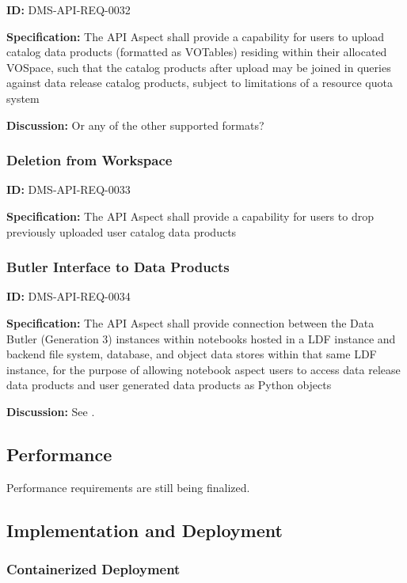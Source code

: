 \documentclass[SE,toc,lsstdraft]{lsstdoc}
\begin{document}
\label{DMS-API-REQ-0032}
\textbf{ID:} DMS-API-REQ-0032

\textbf{Specification:}
The API Aspect shall provide a capability for users to upload catalog data products (formatted as VOTables) residing within their allocated VOSpace, such that the catalog products after upload may be joined in queries against data release catalog products, subject to limitations of a resource quota system

\textbf{Discussion:}
Or any of the other supported formats?

\subsubsection{Deletion from Workspace}

\label{DMS-API-REQ-0033}
\textbf{ID:} DMS-API-REQ-0033

\textbf{Specification:}
The API Aspect shall provide a capability for users to drop previously uploaded user catalog data products

\subsubsection{Butler Interface to Data Products}

\label{DMS-API-REQ-0034}
\textbf{ID:} DMS-API-REQ-0034

\textbf{Specification:}
The API Aspect shall provide connection between the Data Butler (Generation 3) instances within notebooks hosted in a LDF instance and backend file system, database, and object data stores within that same LDF instance, for the purpose of allowing notebook aspect users to access data release data products and user generated data products as Python objects

\textbf{Discussion:}
See .

\subsection{Performance}

Performance requirements are still being finalized.

\subsection{Implementation and Deployment}

\subsubsection{Containerized Deployment}
\end{document}

